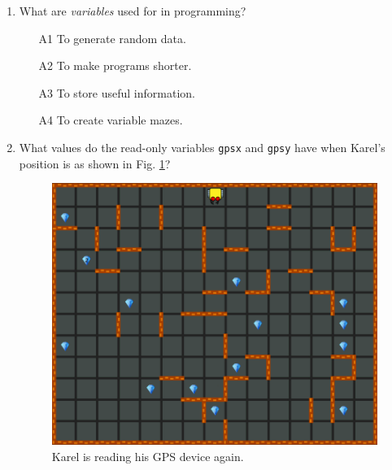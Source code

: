 \begin{enumerate}
\item What are {\em variables} used for in programming? 
\begin{enumerate}
\item[A1] To generate random data.
\item[A2] To make programs shorter.
\item[A3] To store useful information.
\item[A4] To create variable mazes.
\end{enumerate}
\item What values do the read-only variables {\tt gpsx} and {\tt gpsy} have when Karel's
position is as shown in Fig. \ref{fig:var2}?

\begin{figure}[!ht]
\begin{center}
\includegraphics[height=0.4\textwidth]{img/variables2.png}
\end{center}
\vspace{-4mm}
\caption{Karel is reading his GPS device again.}
\label{fig:var2}
\end{figure}
\noindent


\end{enumerate}
